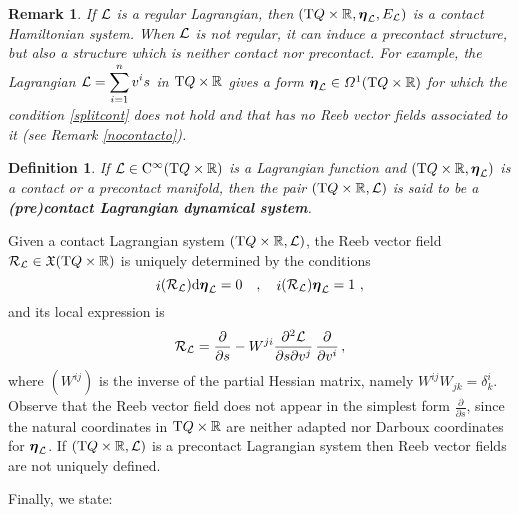 \documentclass[12pt]{report}
\newtheorem{definition}[teor]{Definition}
\newtheorem{remark}[teor]{Remark}
\def\dst{\displaystyle}
\def\derpar#1#2{\frac{\partial{#1}}{\partial{#2}}}
\def\vf{\mathfrak X}
\def\df{{\mit\Omega}}
\def\Lag{{\cal L}}
\def\d{{\rm d}}
\def\Real{\mathbb{R}}
\def\bmeta{\mbox{\boldmath $\eta$}}
\def\Tan{{\rm T}}
\def\inn{\mathop{i}\nolimits}
\def\Cinfty{{\rm C}^\infty}
\newcommand{\Reeb}{\mathcal{R}}
\begin{document}
\begin{remark}
\label{nocontact}{\rm
If $\Lag$ is a regular Lagrangian, then
$(\Tan Q\times\Real,\bmeta_\Lag,E_\Lag)$
is a contact Hamiltonian system.
When $\Lag$ is not regular, it can induce a precontact structure, but also a structure which is neither contact nor precontact.
For example, 
the Lagrangian $\displaystyle \Lag=\sum_{i=1}^n v^i s$ in $\Tan Q\times\Real$
gives a form $\bmeta_\Lag\in\df^1(\Tan Q\times\Real)$
for which the condition \eqref{splitcont} does not hold
and that has no Reeb vector fields associated to it
(see Remark \ref{nocontacto}).
}\end{remark}

\begin{definition}
If $\Lag \in \Cinfty (\Tan Q\times\Real)$ is a Lagrangian function and $(\Tan Q\times\Real,\bmeta_\Lag)$ is
a contact or a precontact manifold, then
the pair $(\Tan Q\times\Real,\Lag)$ is said to be a {\sl\textbf{(pre)contact Lagrangian dynamical system}}.
\label{stdlr1}
\end{definition}

Given a contact Lagrangian system $(\Tan Q\times\Real,\Lag)$, the Reeb vector field $\Reeb_\Lag\in\vf(\Tan Q\times\Real)$ is uniquely determined by the conditions
\begin{equation}\label{eq:reeb}
    \inn(\Reeb_\Lag)\d\bmeta_\Lag=0 \quad ,\quad \inn(\Reeb_\Lag)\bmeta_\Lag=1 \ ,
\end{equation}
and its local expression is
\begin{equation}
\label{coorReeb}
\Reeb_\Lag=\frac{\partial}{\partial s}-W^{ji}\frac{\partial^2\Lag}{\partial s \partial v^j}\,\frac{\partial}{\partial v^i} \,,
\end{equation}
where $(W^{ij})$ is the inverse of the partial Hessian matrix,
namely 
$W^{ij} W_{jk} = \delta^i_{k}$.
Observe that the Reeb vector field does not appear
in the simplest form $\dst\derpar{}{s}$,
since the natural coordinates in $\Tan Q \times \Real$
are neither adapted nor Darboux coordinates for $\bmeta_\Lag$.
If $(\Tan Q\times\Real,\Lag)$ is a precontact Lagrangian system then Reeb vector fields are not uniquely defined.

Finally, we state:
\end{document}
